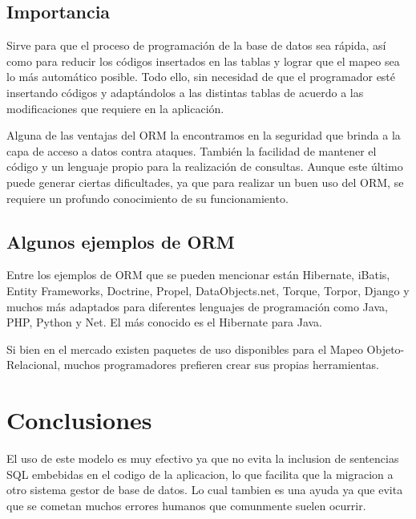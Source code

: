 \documentclass[preprint,12pt]{elsarticle}
\begin{document}
\subsection{Importancia}
Sirve para que el proceso de programación de la base de datos sea rápida, así como para reducir los códigos insertados en las tablas y lograr que el mapeo sea lo más automático posible. Todo ello, sin necesidad de que el programador esté insertando códigos y adaptándolos a las distintas tablas de acuerdo a las modificaciones que requiere en la aplicación.

Alguna de las ventajas del ORM la encontramos en la seguridad que brinda a la capa de acceso a datos contra ataques.  También la facilidad de mantener el código y un lenguaje propio para la realización de consultas. Aunque este último puede generar ciertas dificultades, ya que para realizar un buen uso del ORM, se requiere un profundo conocimiento de su funcionamiento.

\subsection{Algunos ejemplos de ORM}
Entre los ejemplos de ORM que se pueden mencionar están Hibernate, iBatis, Entity Frameworks, Doctrine, Propel, DataObjects.net, Torque, Torpor, Django y muchos más adaptados para diferentes lenguajes de programación como Java, PHP, Python y Net. El más conocido es el Hibernate para Java.

Si bien en el mercado existen paquetes de uso disponibles para el Mapeo Objeto-Relacional, muchos programadores prefieren crear sus propias herramientas.


\section{Conclusiones}
El uso de este modelo es muy efectivo ya que no evita la inclusion de sentencias SQL embebidas en el codigo de la aplicacion, lo que facilita que la migracion a otro sistema gestor de base de datos. Lo cual tambien es una ayuda ya que evita que se cometan muchos errores humanos que comunmente suelen ocurrir.
\end{document}

